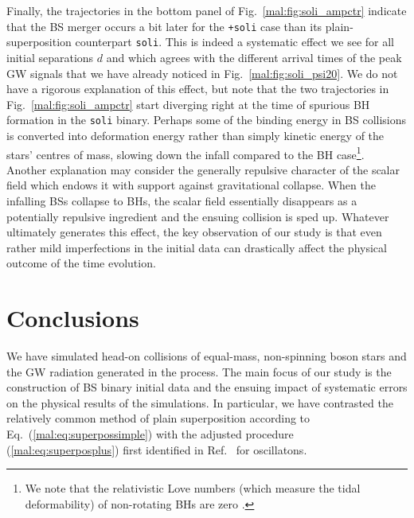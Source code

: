Finally, the trajectories in the bottom panel of
Fig.~\ref{mal:fig:soli_ampctr} indicate that the BS merger occurs a bit later
for the {\tt +soli} case than its plain-superposition counterpart
{\tt soli}. This is indeed a systematic effect we see for all
initial separations $d$ and which agrees with the different arrival
times of the peak GW signals that we have already noticed in
Fig.~\ref{mal:fig:soli_psi20}. We do not have a rigorous explanation
of this effect, but note that the two trajectories in
Fig.~\ref{mal:fig:soli_ampctr} start diverging right at the time of
spurious BH formation in the {\tt soli} binary. Perhaps some of the
binding energy in BS collisions is converted into deformation
energy rather than simply kinetic energy of the stars' centres of mass,
slowing down the infall compared to the BH
case\footnote{We note that the relativistic Love numbers
(which measure the tidal deformability)
of non-rotating BHs are zero
\cite{Binnington:2009bb}.}.
Another explanation
may consider the generally repulsive character of the scalar field
which endows it with support against gravitational collapse. When the
infalling BSs collapse to BHs, the scalar field essentially disappears
as a potentially repulsive ingredient and the ensuing collision
is sped up. Whatever ultimately generates this effect, the key
observation of our study is that even rather mild imperfections in the initial
data can drastically affect the physical outcome of the time evolution.



\section{Conclusions}
\label{mal:sec:conclusions}
%
We have simulated head-on collisions of equal-mass,
non-spinning boson stars and the GW radiation generated in the process.
The main focus of our study is the construction of BS binary initial
data and the ensuing impact of systematic errors on the physical
results of the simulations. In particular, we have contrasted the
relatively common method of
plain superposition according to Eq.~(\ref{mal:eq:superpossimple}) with
the adjusted procedure (\ref{mal:eq:superposplus})
first identified in Ref.~\cite{Helfer:2018vtq} for oscillatons.

